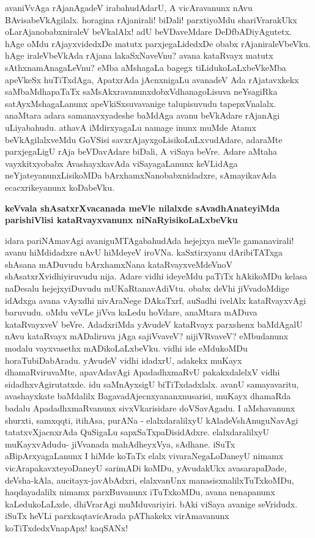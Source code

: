 \noindent
avaniVvAga rAjanAgadeV irabahudAdarU, A vicAravanunx nAvu BAvisa\-beVkAgilalx. hora\-gina rAjanirali! biDali! parxtiyoMdu shariVrarakUkx oLarAjanobabxniraleV beVkalAlx! adU beVDa\-veMdare DeDf\-bADi\-yAgutetx. hAge oMdu rAjayxvidedxDe matutx parxjegaLidedxDe obabx rAjaniraleVbeVku. hAge iraleVbeVkAda rAjana lakaSxNaveVnu? avana kataRvayx matutx sAthxnamAnagaLeVnu? eMba aMshagaLa bagegx tiLidukoLaLx\-beVkeMba apeVkeSx huTiTxdAga, ApatxrAda jAcnxnigaLu avanadeV Ada rAjatavxkekx saMbaMdhapaTaTx saMsAkxravanunx\-dobxVdhanagoLisuva neYsagiRka satAyxMshagaLanunx apeVkiSxsuvavanige talupisuvudu tapepxVnalalx. anaMtara adara samanavxyadeshe baMdAga avanu beVkAdare rAjanAgi uLiyabahudu. athavA iMdirxyagaLu namage inunx muMde Atamx beVkAgilalxveMdu GoVSisi savxrAjayxgoLisikoLuLxvudAdare, adaraMte parxjegaLigU rAja beVDavAdare biDali, A viSaya beVre. Adare aMtaha vayxkitxyobabx AvashayxkavAda viSayagaLanunx keVLidAga neYjateyanunxLisikoMDa bArxhamxNanobabxnidadxre, sAmayikavAda ecacxrikeyanunx koDabeVku.

{\bigskip
\noindent
{\large\bf keVvala shAsatxrXvacanada meVle nilalxde sAvadhAnateyiMda parishiVlisi kataRvayxvanunx niNaRyisi\-koLaLx\-beVku}}\label{page253}
\medskip

\noindent
idara pariNAmavAgi avaniguMTAgabahudAda hejejxya meVle gamanavirali! avanu hiMdi\-dadxre nAvU hiMdeyeV iroVNa. kaSxtirxyanu dAribiTATxga shAsana mADuvudu bArxhamxNana kataRvayx\-veMdeVnoV shAsatxrXvidhiyiruvudu nija. Adare vidhi ideyeMdu paTiTx hAkikoMDu kelasa naDesalu hejejxyiDu\-vudu mUKaRtanavAdiVtu. obabx deVhi jiVvadoMdige idAdxga avana vAyxdhi nivAraNege DAkaTxrf, auSadhi ivelAlx\- kataRvayxvAgi baruvudu. oMdu veVLe jiVva kaLedu hoVdare, anaMtara mADuva kataRvayxveV beVre. AdadxriMda yAvudeV kataRvayx parxshenx baMdAgalU nAvu kataRvayx mADaliruva jAga sajiV\-vaveV? nijiVRvaveV? eMbudanunx modalu vayxvasethx mADikoLaLxbeVku. vidhi ide eMdukoMDu horaTu\-biDa\-bAradu. yAvudeV vidhi idadxrU, adakekx muKayx dhamaRviruvaMte, apavAdavAgi Apadadhx\-maRvU pakakx\-dalelxV vidhi sidadhxvAgirutatxde. idu saMnAyxsigU biTiTxdadxlalx. avanU samayavaritu, avashayxkate baMdalilx\- BagavadAjecnxyananxnusarisi, muKayx dhamaRda badalu ApadadhxmaRvanunx sivxVkarisidare doVSa\-vAgadu. I aMsha\-vanunx shurxti, samxqqti, itihAsa, purANa - elalxdaralilxyU kAladeVshAnuguNavAgi tatatxvXjacnx\-rAda QuSi\-gaLu sapxSaTxpaDisidAdxre. elalxdaralilxyU muKayxvAdudu- jiVvanada mahAdheyxVya, sAdhane. iSuTx aBi\-pArxya\-gaLanunx I hiMde koTaTx elalx vivaraNegaLoDaneyU nimamx vicArapakavxteyoDa\-neyU sari\-mADi\-
koMDu, yAvudakUkx avasarapaDade, deVsha-kAla, aucitayx-javAbAdxri, elalxvanUnx manasisxnalilxTuTxkoMDu,
 haqdayadalilx nimamx parxBuvanunx iTuTxkoMDu, avana nenapanunx kaLedukoLaLxde, dhiVrarAgi muMduvariyiri. bAki viSaya avanige seVridudx. iSuTx heVLi parxkaqtavicArada pAThakekx virAmavanunx koTiTxdedxVnapApx! kaqSANx!

